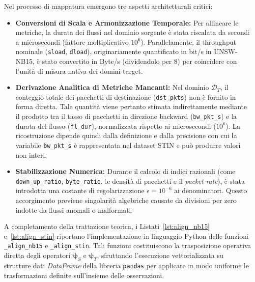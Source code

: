 Nel processo di mappatura emergono tre aspetti architetturali critici:
\begin{itemize}
    \item \textbf{Conversioni di Scala e Armonizzazione Temporale:} Per allineare le metriche, la durata dei flussi nel dominio sorgente è stata riscalata da secondi a microsecondi (fattore moltiplicativo $10^6$). Parallelamente, il throughput nominale (\texttt{sload}, \texttt{dload}), originariamente quantificato in bit/s in UNSW-NB15, è stato convertito in Byte/s (dividendolo per 8) per coincidere con l'unità di misura nativa dei domini target.
    \item \textbf{Derivazione Analitica di Metriche Mancanti:} Nel dominio $\mathcal{D}_T$, il conteggio totale dei pacchetti di destinazione (\texttt{dst\_pkts}) non è fornito in forma diretta. Tale quantità viene pertanto stimata indirettamente mediante il prodotto tra il tasso di pacchetti in direzione backward (\texttt{bw\_pkt\_s}) e la durata del flusso (\texttt{fl\_dur}), normalizzata rispetto ai microsecondi ($10^6$). La ricostruzione dipende quindi dalla definizione e dalla precisione con cui la variabile \texttt{bw\_pkt\_s} è rappresentata nel dataset STIN e può produrre valori non interi.
    \item \textbf{Stabilizzazione Numerica:} Durante il calcolo di indici razionali (come \texttt{down\_up\_ratio}, \texttt{byte\_ratio}, le densità di pacchetti e il \textit{packet rate}), è stata introdotta una costante di regolarizzazione $\epsilon = 10^{-6}$ ai denominatori. Questo accorgimento previene singolarità algebriche causate da divisioni per zero indotte da flussi anomali o malformati.
\end{itemize}

A completamento della trattazione teorica, i Listati~\ref{lst:align_nb15} e~\ref{lst:align_stin} riportano l'implementazione in linguaggio Python delle funzioni \texttt{\_align\_nb15} e \texttt{\_align\_stin}.
Tali funzioni costituiscono la trasposizione operativa diretta degli operatori $\boldsymbol{\psi}_S$ e $\boldsymbol{\psi}_T$, sfruttando l'esecuzione vettorializzata su strutture dati \textit{DataFrame} della libreria \texttt{pandas} per applicare in modo uniforme le trasformazioni definite sull'insieme delle osservazioni.

\newpage

